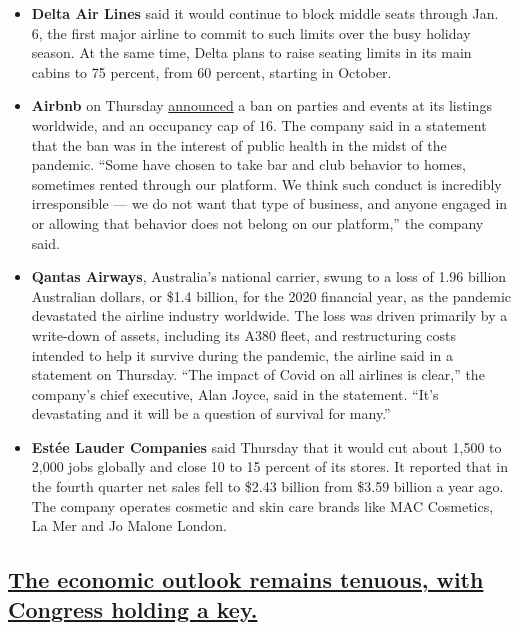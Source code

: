 \begin{itemize}
\item
  \textbf{Delta Air Lines} said it would continue to block middle seats
  through Jan. 6, the first major airline to commit to such limits over
  the busy holiday season. At the same time, Delta plans to raise
  seating limits in its main cabins to 75 percent, from 60 percent,
  starting in October.
\item
  \textbf{Airbnb} on Thursday
  \href{https://news.airbnb.com/airbnb-announces-global-party-ban/}{announced}
  a ban on parties and events at its listings worldwide, and an
  occupancy cap of 16. The company said in a statement that the ban was
  in the interest of public health in the midst of the pandemic. ``Some
  have chosen to take bar and club behavior to homes, sometimes rented
  through our platform. We think such conduct is incredibly
  irresponsible --- we do not want that type of business, and anyone
  engaged in or allowing that behavior does not belong on our
  platform,'' the company said.
\item
  \textbf{Qantas Airways}, Australia's national carrier, swung to a loss
  of 1.96 billion Australian dollars, or \$1.4 billion, for the 2020
  financial year, as the pandemic devastated the airline industry
  worldwide. The loss was driven primarily by a write-down of assets,
  including its A380 fleet, and restructuring costs intended to help it
  survive during the pandemic, the airline said in a statement on
  Thursday. ``The impact of Covid on all airlines is clear,'' the
  company's chief executive, Alan Joyce, said in the statement. ``It's
  devastating and it will be a question of survival for many.''
\item
  \textbf{Estée Lauder Companies} said Thursday that it would cut about
  1,500 to 2,000 jobs globally and close 10 to 15 percent of its stores.
  It reported that in the fourth quarter net sales fell to \$2.43
  billion from \$3.59 billion a year ago. The company operates cosmetic
  and skin care brands like MAC Cosmetics, La Mer and Jo Malone London.
\end{itemize}

\hypertarget{the-economic-outlook-remains-tenuous-with-congress-holding-a-key}{%
\subsection{\texorpdfstring{\protect\hyperlink{the-economic-outlook-remains-tenuous-with-congress-holding-a-key}{The
economic outlook remains tenuous, with Congress holding a
key.}}{The economic outlook remains tenuous, with Congress holding a key.}}\label{the-economic-outlook-remains-tenuous-with-congress-holding-a-key}}

